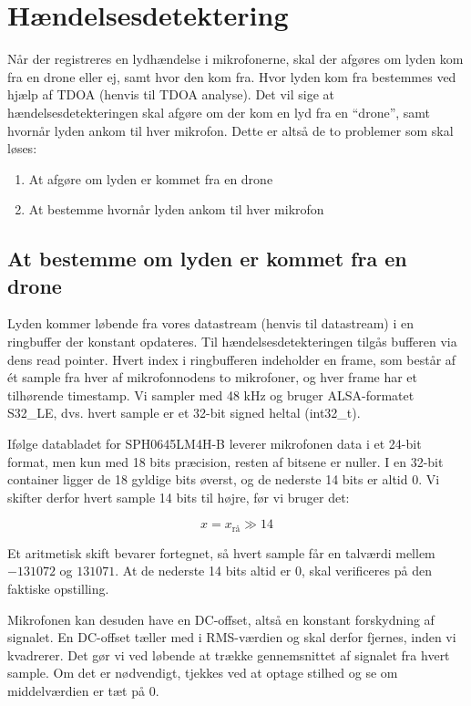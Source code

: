 \documentclass[
  danish,
]{article}
\author{}
\date{}
\begin{document}
\section{Hændelsesdetektering}\label{huxe6ndelsesdetektering}

Når der registreres en lydhændelse i mikrofonerne, skal der afgøres om
lyden kom fra en drone eller ej, samt hvor den kom fra. Hvor lyden kom
fra bestemmes ved hjælp af TDOA (henvis til TDOA analyse). Det vil sige
at hændelsesdetekteringen skal afgøre om der kom en lyd fra en
``drone'', samt hvornår lyden ankom til hver mikrofon. Dette er altså de
to problemer som skal løses:

\begin{enumerate}
\def\labelenumi{\arabic{enumi}.}
\item
  At afgøre om lyden er kommet fra en drone
\item
  At bestemme hvornår lyden ankom til hver mikrofon
\end{enumerate}

\subsection{At bestemme om lyden er kommet fra en
drone}\label{at-bestemme-om-lyden-er-kommet-fra-en-drone}

Lyden kommer løbende fra vores datastream (henvis til datastream) i en
ringbuffer der konstant opdateres. Til hændelsesdetekteringen tilgås
bufferen via dens read pointer. Hvert index i ringbufferen indeholder en
frame, som består af ét sample fra hver af mikrofonnodens to mikrofoner,
og hver frame har et tilhørende timestamp. Vi sampler med 48 kHz og
bruger ALSA-formatet S32\_LE, dvs. hvert sample er et 32-bit signed
heltal (int32\_t).

Ifølge databladet for SPH0645LM4H-B leverer mikrofonen data i et 24-bit
format, men kun med 18 bits præcision, resten af bitsene er nuller. I en
32-bit container ligger de 18 gyldige bits øverst, og de nederste 14
bits er altid 0. Vi skifter derfor hvert sample 14 bits til højre, før
vi bruger det:

\[x = x_{\text{rå}} \gg 14\]

Et aritmetisk skift bevarer fortegnet, så hvert sample får en talværdi
mellem \(-131072\) og \(131071\). At de nederste 14 bits altid er 0, skal
verificeres på den faktiske opstilling.

Mikrofonen kan desuden have en DC-offset, altså en konstant forskydning
af signalet. En DC-offset tæller med i RMS-værdien og skal derfor
fjernes, inden vi kvadrerer. Det gør vi ved løbende at trække
gennemsnittet af signalet fra hvert sample. Om det er nødvendigt,
tjekkes ved at optage stilhed og se om middelværdien er tæt på 0.
\end{document}
